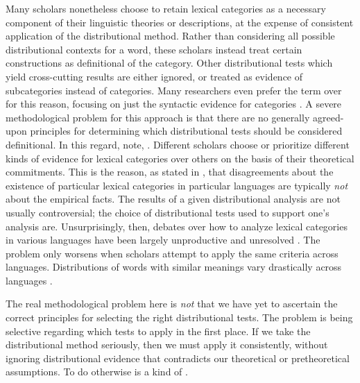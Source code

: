 
Many scholars nonetheless choose to retain lexical categories as a necessary component of their linguistic theories or descriptions, at the expense of consistent application of the distributional method. Rather than considering all possible distributional contexts for a word, these scholars instead treat certain constructions as definitional of the category. Other distributional tests which yield cross-cutting results are either ignored, or treated as evidence of subcategories instead of categories. Many researchers even prefer the term  over  for this reason, focusing on just the syntactic evidence for categories . A severe methodological problem for this approach is that there are no generally agreed-upon principles for determining which distributional tests should be considered definitional. In this regard, \textcite[4]{SchachterShopen2007} note, . Different scholars choose or prioritize different kinds of evidence for lexical categories over others on the basis of their theoretical commitments. This is the reason, as stated in , that disagreements about the existence of particular lexical categories in particular languages are typically \emph{not} about the empirical facts. The results of a given distributional analysis are not usually controversial; the choice of distributional tests used to support one's analysis are. Unsurprisingly, then, debates over how to analyze lexical categories in various languages have been largely unproductive and unresolved \parencite[435]{Croft2005}. The problem only worsens when scholars attempt to apply the same criteria across languages. Distributions of words with similar meanings vary drastically across languages \parencite[§1.4.1]{Croft2001}.

The real methodological problem here is \emph{not} that we have yet to ascertain the correct principles for selecting the right distributional tests. The problem is being selective regarding which tests to apply in the first place. If we take the distributional method seriously, then we must apply it consistently, without ignoring distributional evidence that contradicts our theoretical or pretheoretical assumptions. To do otherwise is a kind of  .

